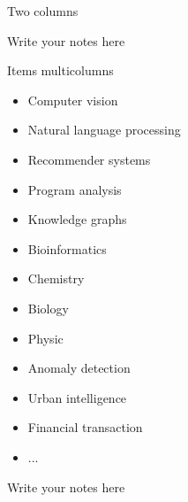 \documentclass{beamer}
\begin{document}
\begin{frame}{Two columns}
        \begin{note}
            {Write your notes here}
        \end{note}
    \end{frame}

    \begin{frame}{Items multicolumns}
        \begin{multicols}{2}
            \begin{itemize}
                \item Computer vision
                \item Natural language processing
                \item Recommender systems
                \item Program analysis
                \item Knowledge graphs
                \item Bioinformatics
                \item Chemistry
                \item Biology
                \item Physic
                \item Anomaly detection
                \item Urban intelligence
                \item Financial transaction
                \item ...
            \end{itemize}
        \end{multicols}

        \begin{note}
            {Write your notes here}
        \end{note}
    \end{frame}
\end{document}
